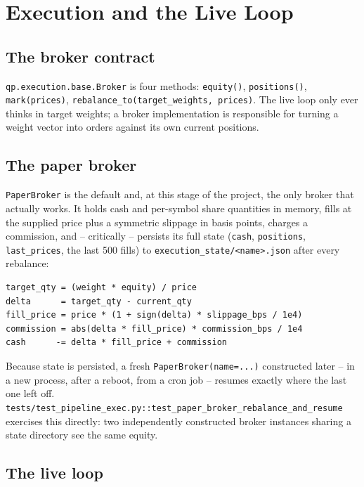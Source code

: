 \chapter{Execution and the Live Loop}

\section{The broker contract}

\texttt{qp.execution.base.Broker} is four methods: \texttt{equity()},
\texttt{positions()}, \texttt{mark(prices)}, \texttt{rebalance\_to(target\_weights, prices)}.
The live loop only ever thinks in target weights; a broker implementation is
responsible for turning a weight vector into orders against its own current
positions.

\section{The paper broker}

\texttt{PaperBroker} is the default and, at this stage of the project, the only
broker that actually works. It holds cash and per-symbol share quantities in
memory, fills at the supplied price plus a symmetric slippage in basis points,
charges a commission, and -- critically -- persists its full state
(\texttt{cash}, \texttt{positions}, \texttt{last\_prices}, the last 500 fills) to
\texttt{execution\_state/<name>.json} after every rebalance:

\begin{lstlisting}
target_qty = (weight * equity) / price
delta      = target_qty - current_qty
fill_price = price * (1 + sign(delta) * slippage_bps / 1e4)
commission = abs(delta * fill_price) * commission_bps / 1e4
cash      -= delta * fill_price + commission
\end{lstlisting}

Because state is persisted, a fresh \texttt{PaperBroker(name=...)} constructed
later -- in a new process, after a reboot, from a cron job -- resumes exactly
where the last one left off. \texttt{tests/test\_pipeline\_exec.py::test\_paper\_broker\_rebalance\_and\_resume}
exercises this directly: two independently constructed broker instances sharing
a state directory see the same equity.

\section{The live loop}

